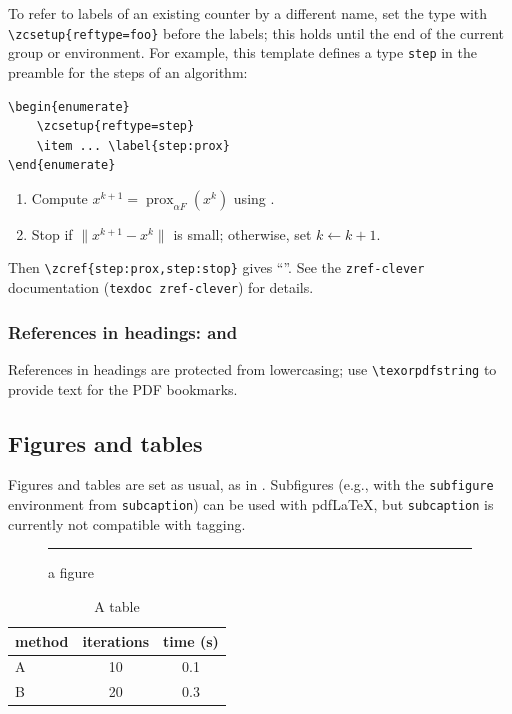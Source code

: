 \documentclass[english,review]{jnsao}
\newcommand{\cs}[1]{\texttt{\textbackslash#1}}
\newcommand{\pkg}[1]{\texttt{#1}}
\DeclareMathOperator{\prox}{prox}
\begin{document}
To refer to labels of an existing counter by a different name, set the type with \verb!\zcsetup{reftype=foo}! before the labels; this holds until the end of the current group or environment. For example, this template defines a type \texttt{step} in the preamble for the steps of an algorithm:
\begin{verbatim}
\begin{enumerate}
    \zcsetup{reftype=step}
    \item ... \label{step:prox}
\end{enumerate}
\end{verbatim}
\begin{enumerate}
    \item Compute $x^{k+1} = \prox_{\alpha F}(x^k)$ using .\label{step:prox}
    \item Stop if $\|x^{k+1}-x^k\|$ is small; otherwise, set $k\gets k+1$.\label{step:stop}
\end{enumerate}
Then \verb!\zcref{step:prox,step:stop}! gives ``''. See the \pkg{zref-clever} documentation (\texttt{texdoc zref-clever}) for details.

\subsubsection{References in headings: \texorpdfstring{ and }{main theorem}}

References in headings are protected from lowercasing; use \cs{texorpdfstring} to provide text for the PDF bookmarks.

\subsection{Figures and tables}

Figures and tables are set as usual, as in . Subfigures (e.g., with the \pkg{subfigure} environment from \pkg{subcaption}) can be used with pdf\LaTeX{}, but \pkg{subcaption} is currently not compatible with tagging.

\begin{figure}[t]
    \centering
    \rule{3cm}{2cm}
    \caption{a figure}\label{fig:example}
\end{figure}

\begin{table}[b]
    \centering
    \caption{A table}\label{tab:example}
    \begin{tabular}{lcc}
        \hline
        method & iterations & time (s) \\
        \hline
        A & 10 & 0.1 \\
        B & 20 & 0.3 \\
        \hline
    \end{tabular}
\end{table}
\end{document}
